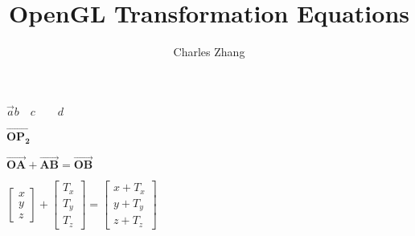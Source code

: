 \documentclass[12pt]{article}
\title{OpenGL Transformation Equations}
\author{Charles Zhang}
\begin{document}
\maketitle




$
\vec a b\quad c\quad\quad d
$

\vspace{4ex}

$
\boldsymbol{\overrightarrow{OP_2}}
$

\vspace{4ex}

$
\boldsymbol{\overrightarrow{OA}} + \boldsymbol{\overrightarrow{AB}} = \boldsymbol{\overrightarrow{OB}}
$

\vspace{4ex}

$
\begin{bmatrix} 
x \\ 
y \\
z
\end{bmatrix}
+
\begin{bmatrix} 
T_x \\
T_y \\
T_z 
\end{bmatrix}
=
\begin{bmatrix} 
x + T_x \\ 
y + T_y \\
z + T_z
\end{bmatrix}
$


\vspace{4ex}
\end{document}
